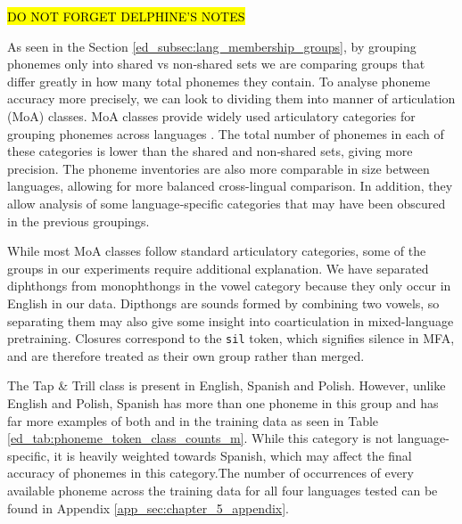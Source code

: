 \hl{DO NOT FORGET DELPHINE'S NOTES}

As seen in the Section \ref{ed_subsec:lang_membership_groups}, by grouping phonemes only into shared vs non‑shared sets we are comparing groups that differ greatly in how many total phonemes they contain. To analyse phoneme accuracy more precisely, we can look to dividing them into manner of articulation (MoA) classes. MoA classes provide widely used articulatory categories for grouping phonemes across languages \cite{international1999handbook}. The total number of phonemes in each of these categories is lower than the shared and non‑shared sets, giving more precision. The phoneme inventories are also more comparable in size between languages, allowing for more balanced cross-lingual comparison. In addition, they allow analysis of some language‑specific categories that may have been obscured in the previous groupings. 

While most MoA classes follow standard articulatory categories, some of the groups in our experiments require additional explanation. We have separated diphthongs from monophthongs in the vowel category because they only occur in English in our data. Dipthongs are sounds formed by combining two vowels, so separating them may  also give some insight into coarticulation in mixed-language pretraining. Closures correspond to the \texttt{sil} token, which signifies silence in MFA, and are therefore treated as their own group rather than merged. 

The Tap \& Trill class is present in English, Spanish and Polish. However, unlike English and Polish, Spanish has more than one phoneme in this group and has far more examples of both  and   in the training data as seen in Table \ref{ed_tab:phoneme_token_class_counts_m}. While this category is not language-specific, it is heavily weighted towards Spanish, which may affect the final accuracy of phonemes in this category.The number of occurrences of every available phoneme across the training data for all four languages tested can be found in Appendix \ref{app_sec:chapter_5_appendix}.

